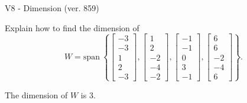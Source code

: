\begin{exercise}
  \begin{exerciseTitle}V8 - Dimension (ver. 859)\end{exerciseTitle}
  \begin{exerciseStatement}
    Explain how to find the dimension of 
\[W=\mathrm{span}\ \left\{\left[\begin{array}{r}
-3 \\
-3 \\
1 \\
2 \\
-3
\end{array}\right] , \left[\begin{array}{r}
1 \\
2 \\
-2 \\
-4 \\
-2
\end{array}\right] , \left[\begin{array}{r}
-1 \\
-1 \\
0 \\
3 \\
-1
\end{array}\right] , \left[\begin{array}{r}
6 \\
6 \\
-2 \\
-4 \\
6
\end{array}\right]\right\}.\]



  \end{exerciseStatement}
  \begin{exerciseAnswer}
   The dimension of \(W\) is  \(3\).
  


  \end{exerciseAnswer}
\end{exercise}